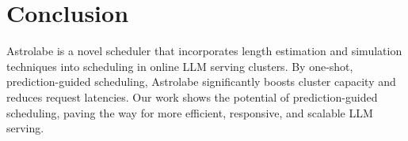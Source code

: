\documentclass[sigconf, review, anonymous]{acmart}
\begin{document}


\section{Conclusion}
Astrolabe is a novel scheduler that incorporates length estimation and simulation techniques into scheduling in online LLM serving clusters. By one-shot, prediction-guided scheduling, Astrolabe significantly boosts cluster capacity and reduces request latencies. Our work shows the potential of prediction-guided scheduling, paving the way for more efficient, responsive, and scalable LLM serving.



\end{document}
